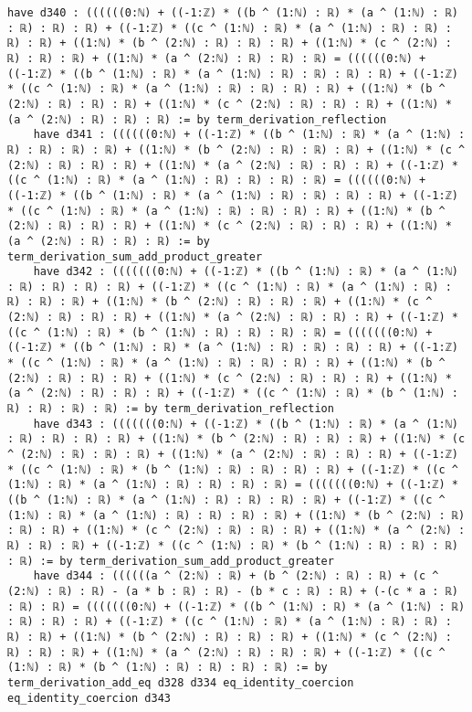 \documentclass{article}
\begin{document}
\begin{tcolorbox}[colback=white!10, width=\linewidth]
\begin{lstlisting}[language=Lean4]
    have d340 : ((((((0:ℕ) + ((-1:ℤ) * ((b ^ (1:ℕ) : ℝ) * (a ^ (1:ℕ) : ℝ) : ℝ) : ℝ) : ℝ) + ((-1:ℤ) * ((c ^ (1:ℕ) : ℝ) * (a ^ (1:ℕ) : ℝ) : ℝ) : ℝ) : ℝ) + ((1:ℕ) * (b ^ (2:ℕ) : ℝ) : ℝ) : ℝ) + ((1:ℕ) * (c ^ (2:ℕ) : ℝ) : ℝ) : ℝ) + ((1:ℕ) * (a ^ (2:ℕ) : ℝ) : ℝ) : ℝ) = ((((((0:ℕ) + ((-1:ℤ) * ((b ^ (1:ℕ) : ℝ) * (a ^ (1:ℕ) : ℝ) : ℝ) : ℝ) : ℝ) + ((-1:ℤ) * ((c ^ (1:ℕ) : ℝ) * (a ^ (1:ℕ) : ℝ) : ℝ) : ℝ) : ℝ) + ((1:ℕ) * (b ^ (2:ℕ) : ℝ) : ℝ) : ℝ) + ((1:ℕ) * (c ^ (2:ℕ) : ℝ) : ℝ) : ℝ) + ((1:ℕ) * (a ^ (2:ℕ) : ℝ) : ℝ) : ℝ) := by term_derivation_reflection
    have d341 : ((((((0:ℕ) + ((-1:ℤ) * ((b ^ (1:ℕ) : ℝ) * (a ^ (1:ℕ) : ℝ) : ℝ) : ℝ) : ℝ) + ((1:ℕ) * (b ^ (2:ℕ) : ℝ) : ℝ) : ℝ) + ((1:ℕ) * (c ^ (2:ℕ) : ℝ) : ℝ) : ℝ) + ((1:ℕ) * (a ^ (2:ℕ) : ℝ) : ℝ) : ℝ) + ((-1:ℤ) * ((c ^ (1:ℕ) : ℝ) * (a ^ (1:ℕ) : ℝ) : ℝ) : ℝ) : ℝ) = ((((((0:ℕ) + ((-1:ℤ) * ((b ^ (1:ℕ) : ℝ) * (a ^ (1:ℕ) : ℝ) : ℝ) : ℝ) : ℝ) + ((-1:ℤ) * ((c ^ (1:ℕ) : ℝ) * (a ^ (1:ℕ) : ℝ) : ℝ) : ℝ) : ℝ) + ((1:ℕ) * (b ^ (2:ℕ) : ℝ) : ℝ) : ℝ) + ((1:ℕ) * (c ^ (2:ℕ) : ℝ) : ℝ) : ℝ) + ((1:ℕ) * (a ^ (2:ℕ) : ℝ) : ℝ) : ℝ) := by term_derivation_sum_add_product_greater
    have d342 : (((((((0:ℕ) + ((-1:ℤ) * ((b ^ (1:ℕ) : ℝ) * (a ^ (1:ℕ) : ℝ) : ℝ) : ℝ) : ℝ) + ((-1:ℤ) * ((c ^ (1:ℕ) : ℝ) * (a ^ (1:ℕ) : ℝ) : ℝ) : ℝ) : ℝ) + ((1:ℕ) * (b ^ (2:ℕ) : ℝ) : ℝ) : ℝ) + ((1:ℕ) * (c ^ (2:ℕ) : ℝ) : ℝ) : ℝ) + ((1:ℕ) * (a ^ (2:ℕ) : ℝ) : ℝ) : ℝ) + ((-1:ℤ) * ((c ^ (1:ℕ) : ℝ) * (b ^ (1:ℕ) : ℝ) : ℝ) : ℝ) : ℝ) = (((((((0:ℕ) + ((-1:ℤ) * ((b ^ (1:ℕ) : ℝ) * (a ^ (1:ℕ) : ℝ) : ℝ) : ℝ) : ℝ) + ((-1:ℤ) * ((c ^ (1:ℕ) : ℝ) * (a ^ (1:ℕ) : ℝ) : ℝ) : ℝ) : ℝ) + ((1:ℕ) * (b ^ (2:ℕ) : ℝ) : ℝ) : ℝ) + ((1:ℕ) * (c ^ (2:ℕ) : ℝ) : ℝ) : ℝ) + ((1:ℕ) * (a ^ (2:ℕ) : ℝ) : ℝ) : ℝ) + ((-1:ℤ) * ((c ^ (1:ℕ) : ℝ) * (b ^ (1:ℕ) : ℝ) : ℝ) : ℝ) : ℝ) := by term_derivation_reflection
    have d343 : (((((((0:ℕ) + ((-1:ℤ) * ((b ^ (1:ℕ) : ℝ) * (a ^ (1:ℕ) : ℝ) : ℝ) : ℝ) : ℝ) + ((1:ℕ) * (b ^ (2:ℕ) : ℝ) : ℝ) : ℝ) + ((1:ℕ) * (c ^ (2:ℕ) : ℝ) : ℝ) : ℝ) + ((1:ℕ) * (a ^ (2:ℕ) : ℝ) : ℝ) : ℝ) + ((-1:ℤ) * ((c ^ (1:ℕ) : ℝ) * (b ^ (1:ℕ) : ℝ) : ℝ) : ℝ) : ℝ) + ((-1:ℤ) * ((c ^ (1:ℕ) : ℝ) * (a ^ (1:ℕ) : ℝ) : ℝ) : ℝ) : ℝ) = (((((((0:ℕ) + ((-1:ℤ) * ((b ^ (1:ℕ) : ℝ) * (a ^ (1:ℕ) : ℝ) : ℝ) : ℝ) : ℝ) + ((-1:ℤ) * ((c ^ (1:ℕ) : ℝ) * (a ^ (1:ℕ) : ℝ) : ℝ) : ℝ) : ℝ) + ((1:ℕ) * (b ^ (2:ℕ) : ℝ) : ℝ) : ℝ) + ((1:ℕ) * (c ^ (2:ℕ) : ℝ) : ℝ) : ℝ) + ((1:ℕ) * (a ^ (2:ℕ) : ℝ) : ℝ) : ℝ) + ((-1:ℤ) * ((c ^ (1:ℕ) : ℝ) * (b ^ (1:ℕ) : ℝ) : ℝ) : ℝ) : ℝ) := by term_derivation_sum_add_product_greater
    have d344 : ((((((a ^ (2:ℕ) : ℝ) + (b ^ (2:ℕ) : ℝ) : ℝ) + (c ^ (2:ℕ) : ℝ) : ℝ) - (a * b : ℝ) : ℝ) - (b * c : ℝ) : ℝ) + (-(c * a : ℝ) : ℝ) : ℝ) = (((((((0:ℕ) + ((-1:ℤ) * ((b ^ (1:ℕ) : ℝ) * (a ^ (1:ℕ) : ℝ) : ℝ) : ℝ) : ℝ) + ((-1:ℤ) * ((c ^ (1:ℕ) : ℝ) * (a ^ (1:ℕ) : ℝ) : ℝ) : ℝ) : ℝ) + ((1:ℕ) * (b ^ (2:ℕ) : ℝ) : ℝ) : ℝ) + ((1:ℕ) * (c ^ (2:ℕ) : ℝ) : ℝ) : ℝ) + ((1:ℕ) * (a ^ (2:ℕ) : ℝ) : ℝ) : ℝ) + ((-1:ℤ) * ((c ^ (1:ℕ) : ℝ) * (b ^ (1:ℕ) : ℝ) : ℝ) : ℝ) : ℝ) := by term_derivation_add_eq d328 d334 eq_identity_coercion eq_identity_coercion d343

\end{lstlisting}
\end{tcolorbox}
\end{document}
